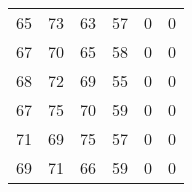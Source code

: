 \begin{tabular}{cccccc}
65     & 73     & 63     & 57     & 0      & 0 \\
67     & 70     & 65     & 58     & 0      & 0 \\
68     & 72     & 69     & 55     & 0      & 0 \\
67     & 75     & 70     & 59     & 0      & 0 \\
71     & 69     & 75     & 57     & 0      & 0 \\
69     & 71     & 66     & 59     & 0      & 0 \bigstrut[b]\\
\hline
\hline
\end{tabular}%

